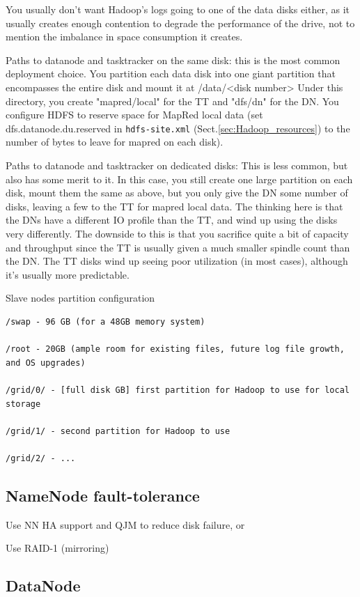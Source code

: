 You usually don't want Hadoop's logs going to one of the data disks either, as
it usually creates enough contention to degrade the performance of the drive,
not to mention the imbalance in space consumption it creates.  

Paths to datanode and tasktracker on the same disk: this is the most common
deployment choice. You partition each data disk into one giant partition that
encompasses the entire disk and mount it at /data/<disk number>
Under this directory, you create "mapred/local" for the TT and "dfs/dn" for the
DN. You configure HDFS to reserve space for MapRed local data (set
dfs.datanode.du.reserved in \verb!hdfs-site.xml! (Sect.\ref{sec:Hadoop_resources}) to the
number of bytes to leave for mapred on each disk). 


Paths to datanode and tasktracker on dedicated disks:
This is less common, but also has some merit to it. In this case, you still
create one large partition on each disk, mount them the same as above, but you
only give the DN some number of disks, leaving a few to the TT for mapred local
data. The thinking here is that the DNs have a different IO profile than the TT,
and wind up using the disks very differently. The downside to this is that you
sacrifice quite a bit of capacity and throughput since the TT is usually given a
much smaller spindle count than the DN. The TT disks wind up seeing poor
utilization (in most cases), although it's usually more predictable.

Slave nodes partition configuration
\begin{verbatim}
/swap - 96 GB (for a 48GB memory system)

/root - 20GB (ample room for existing files, future log file growth, and OS upgrades)

/grid/0/ - [full disk GB] first partition for Hadoop to use for local storage

/grid/1/ - second partition for Hadoop to use

/grid/2/ - ...
\end{verbatim}


\subsection{NameNode fault-tolerance}

Use NN HA support and QJM to reduce disk failure, or 

Use RAID-1 (mirroring)


\subsection{DataNode}


